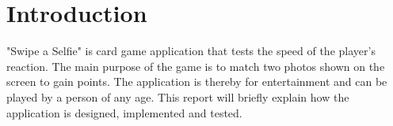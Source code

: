 \section{Introduction}
"Swipe a Selfie" is card game application that tests the speed of the player’s reaction. The main purpose of the game is to match two photos shown on the screen to gain points. The application is thereby for entertainment and can be played by a person of any age. This report will briefly explain how the application is designed, implemented and tested.
